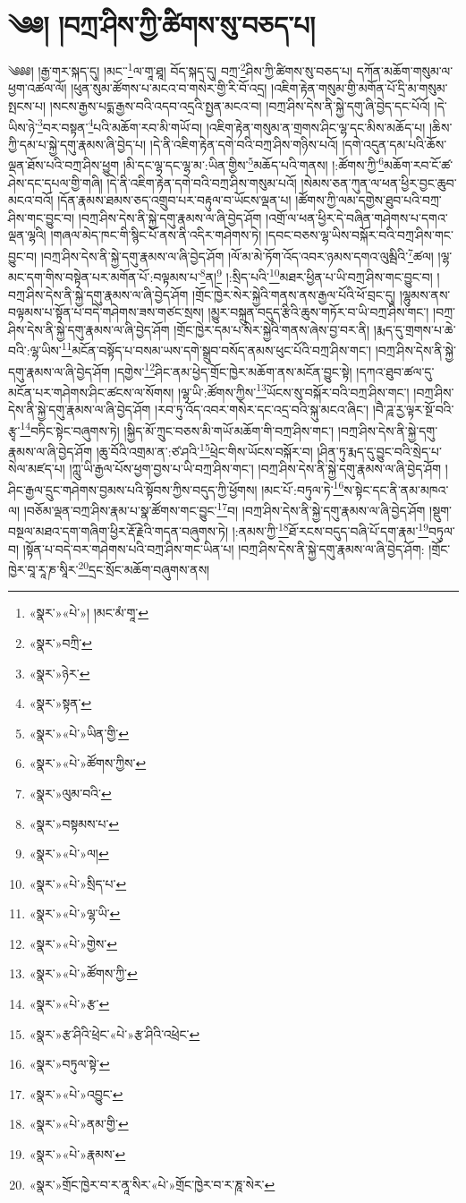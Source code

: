 \chapter{༄༅། །བཀྲ་ཤིས་ཀྱི་ཚིགས་སུ་བཅད་པ།}༄༅༅། །རྒྱ་གར་སྐད་དུ། །མང་་\footnote{«སྣར་»«པེ་»། །མང་མཾ་གཱ་}ལ་གཱ་ཐཱ། བོད་སྐད་དུ། བཀྲ་\footnote{«སྣར་»བཀྲི་}ཤིས་ཀྱི་ཚིགས་སུ་བཅད་པ། དཀོན་མཆོག་གསུམ་ལ་ཕྱག་འཚལ་ལོ། །ཕུན་སུམ་ཚོགས་པ་མངའ་བ་གསེར་གྱི་རི་བོ་འདྲ། །འཇིག་རྟེན་གསུམ་གྱི་མགོན་པོ་དྲི་མ་གསུམ་སྤངས་པ། །སངས་རྒྱས་པདྨ་རྒྱས་བའི་འདབ་འདྲའི་སྤྱན་མངའ་བ། །བཀྲ་ཤིས་དེས་ནི་སྐྱེ་དགུ་ཞི་བྱེད་དང་པོའོ། །དེ་ཡིས་ཉེ་\footnote{«སྣར་»ཉེར་}བར་བསྟན་\footnote{«སྣར་»སྟན་}པའི་མཆོག་རབ་མི་གཡོ་བ། །འཇིག་རྟེན་གསུམ་ན་གྲགས་ཤིང་ལྷ་དང་མིས་མཆོད་པ། །ཆིས་ཀྱི་དམ་པ་སྐྱེ་དགུ་རྣམས་ཞི་བྱེད་པ། །དེ་ནི་འཇིག་རྟེན་དགེ་བའི་བཀྲ་ཤིས་གཉིས་པའོ། །དགེ་འདུན་དམ་པའི་ཆོས་ལྡན་ཐོས་པའི་བཀྲ་ཤིས་ཕྱུག །མི་དང་ལྷ་དང་ལྷ་མ་:ཡིན་གྱིས་\footnote{«སྣར་»«པེ་»ཡིན་གྱི་}མཆོད་པའི་གནས། །:ཚོགས་ཀྱི་\footnote{«སྣར་»«པེ་»ཚོགས་ཀྱིས་}མཆོག་རབ་ངོ་ཚ་ཤེས་དང་དཔལ་གྱི་གཞི། །དེ་ནི་འཇིག་རྟེན་དགེ་བའི་བཀྲ་ཤིས་གསུམ་པའོ། །སེམས་ཅན་ཀུན་ལ་ཕན་ཕྱིར་བྱང་ཆུབ་མངའ་བའོ། །དོན་རྣམས་ཐམས་ཅད་འགྲུབ་པར་བརྟུལ་བ་ཡོངས་ལྡན་པ། །ཚོགས་ཀྱི་ལམ་དགྱེས་ཐུབ་པའི་བཀྲ་ཤིས་གང་བྱུང་བ། །བཀྲ་ཤིས་དེས་ནི་སྐྱེ་དགུ་རྣམས་ལ་ཞི་བྱེད་ཤོག །འགྲོ་ལ་ཕན་ཕྱིར་དེ་བཞིན་གཤེགས་པ་དགའ་ལྡན་ལྷའི། །གཞལ་མེད་ཁང་གི་སྙིང་པོ་ནས་ནི་འདིར་གཤེགས་ཏེ། །དབང་བཅས་ལྷ་ཡིས་བསྐོར་བའི་བཀྲ་ཤིས་གང་བྱུང་བ། །བཀྲ་ཤིས་དེས་ནི་སྐྱེ་དགུ་རྣམས་ལ་ཞི་བྱེད་ཤོག །ལོ་མ་མེ་ཏོག་འོད་འབར་ཉམས་དགའ་ལུམྦིའི་\footnote{«སྣར་»ལུམ་བའི་}ཚལ། །ལྷ་མང་དག་གིས་བསྟེན་པར་མགོན་པོ་:བལྟམས་པ་\footnote{«སྣར་»བསྟམས་པ་}ན།\footnote{«སྣར་»«པེ་»ལ།} །:སྲིད་པའི་\footnote{«སྣར་»«པེ་»སྲིད་པ་}མཐར་ཕྱིན་པ་ཡི་བཀྲ་ཤིས་གང་བྱུང་བ། །བཀྲ་ཤིས་དེས་ནི་སྐྱེ་དགུ་རྣམས་ལ་ཞི་བྱེད་ཤོག །གྲོང་ཁྱེར་སེར་སྐྱེའི་གནས་ནས་རྒྱལ་པོའི་ཕོ་བྲང་དུ། །ལྷུམས་ནས་བལྟམས་པ་སྟོན་པ་བདེ་གཤེགས་ཟས་གཙང་སྲས། །མྱུར་བསྐྲུན་བདུད་རྩིའི་ཆུས་གཏོར་བ་ཡི་བཀྲ་ཤིས་གང་། །བཀྲ་ཤིས་དེས་ནི་སྐྱེ་དགུ་རྣམས་ལ་ཞི་བྱེད་ཤོག །གྲོང་ཁྱེར་དམ་པ་སེར་སྐྱེའི་གནས་ཞེས་བྱ་བར་ནི། །རྨད་དུ་གྲགས་པ་ཆེ་བའི་:ལྷ་ཡིས་\footnote{«སྣར་»«པེ་»ལྷ་ཡི་}མངོན་བསྟོད་པ་བསམ་ཡས་དགེ་སྒྲུབ་བསོད་ནམས་ཕུང་པོའི་བཀྲ་ཤིས་གང་། །བཀྲ་ཤིས་དེས་ནི་སྐྱེ་དགུ་རྣམས་ལ་ཞི་བྱེད་ཤོག །དགྱེས་\footnote{«སྣར་»«པེ་»གྱེས་}ཤིང་ནམ་ཕྱེད་གྲོང་ཁྱེར་མཆོག་ནས་མངོན་བྱུང་སྟེ། །དཀའ་ཐུབ་ཚལ་དུ་མངོན་པར་གཤེགས་ཤིང་ཚངས་ལ་སོགས། །ལྷ་ཡི་:ཚོགས་ཀྱིས་\footnote{«སྣར་»«པེ་»ཚོགས་ཀྱི་}ཡོངས་སུ་བསྐོར་བའི་བཀྲ་ཤིས་གང་། །བཀྲ་ཤིས་དེས་ནི་སྐྱེ་དགུ་རྣམས་ལ་ཞི་བྱེད་ཤོག །རབ་ཏུ་འོད་འབར་གསེར་དང་འདྲ་བའི་སྐུ་མངའ་ཞིང་། །བཻ་ཌཱ་རྱ་ལྟར་སྔོ་བའི་རྩྭ་\footnote{«སྣར་»«པེ་»རྩ་}བཏིང་སྟེང་བཞུགས་ཏེ། །སྐྱིད་མོ་ཀྲུང་བཅས་མི་གཡོ་མཆོག་གི་བཀྲ་ཤིས་གང་། །བཀྲ་ཤིས་དེས་ནི་སྐྱེ་དགུ་རྣམས་ལ་ཞི་བྱེད་ཤོག །ཆུ་བོའི་འགྲམ་ན་:ཙ་ཤའི་\footnote{«སྣར་»རྩ་ཤིའི་ཕྲེང་«པེ་»རྩ་ཤིའི་འཕྲེང་}ཕྲེང་གིས་ཡོངས་བསྐོར་བ། །ཤིན་ཏུ་རྨད་དུ་བྱུང་བའི་སྲེད་པ་སེལ་མཛད་པ། །ཀླུ་ཡི་རྒྱལ་པོས་ཕྱག་བྱས་པ་ཡི་བཀྲ་ཤིས་གང་། །བཀྲ་ཤིས་དེས་ནི་སྐྱེ་དགུ་རྣམས་ལ་ཞི་བྱེད་ཤོག །ཤིང་རྒྱལ་དྲུང་གཤེགས་བྱམས་པའི་སྟོབས་ཀྱིས་བདུད་ཀྱི་ཕྱོགས། །མང་པོ་:བཏུལ་ཏེ་\footnote{«སྣར་»བཏུལ་སྟེ་}ས་སྟེང་དང་ནི་ནམ་མཁའ་ལ། །བཅོམ་ལྡན་བཀྲ་ཤིས་རྣམ་པ་སྣ་ཚོགས་གང་བྱུང་\footnote{«སྣར་»«པེ་»འབྱུང་}བ། །བཀྲ་ཤིས་དེས་ནི་སྐྱེ་དགུ་རྣམས་ལ་ཞི་བྱེད་ཤོག །སྡུག་བསྔལ་མཐའ་དག་གཞིག་ཕྱིར་རྡོ་རྗེའི་གདན་བཞུགས་ཏེ། །:ནམས་ཀྱི་\footnote{«སྣར་»«པེ་»ནམ་གྱི་}ཐོ་རངས་བདུད་བཞི་པོ་དག་རྣམ་\footnote{«སྣར་»«པེ་»རྣམས་}བཏུལ་བ། །སྟོན་པ་བདེ་བར་གཤེགས་པའི་བཀྲ་ཤིས་གང་ཡིན་པ། །བཀྲ་ཤིས་དེས་ནི་སྐྱེ་དགུ་རྣམས་ལ་ཞི་བྱེད་ཤོག: །གྲོང་ཁྱེར་བཱ་རཱ་ཎ་སཱིར་\footnote{«སྣར་»གྲོང་ཁྱེར་བ་ར་ནཱ་སིར་«པེ་»གྲོང་ཁྱེར་བ་ར་ཎཱ་སེར་}དྲང་སྲོང་མཆོག་བཞུགས་ནས། 